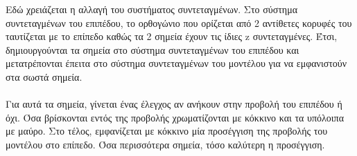 \documentclass{report}
\begin{document}

Εδώ χρειάζεται η αλλαγή του συστήματος συντεταγμένων. Στο σύστημα συντεταγμένων του επιπέδου, το ορθογώνιο που ορίζεται από 2 αντίθετες
κορυφές του ταυτίζεται με το επίπεδο καθώς τα 2 σημεία έχουν τις ίδιες z συντεταγμένες. Έτσι, δημιουργούνται τα σημεία στο σύστημα συντεταγμένων
του επιπέδου και μετατρέπονται έπειτα στο σύστημα συντεταγμένων του μοντέλου για να εμφανιστούν στα σωστά σημεία.
\\\\
Για αυτά τα σημεία, γίνεται ένας έλεγχος αν ανήκουν στην προβολή του επιπέδου ή όχι. Όσα βρίσκονται εντός της προβολής χρωματίζονται με
κόκκινο και τα υπόλοιπα με μαύρο. Στο τέλος, εμφανίζεται με κόκκινο μία προσέγγιση της προβολής του μοντέλου στο επίπεδο. Όσα περισσότερα
σημεία, τόσο καλύτερη η προσέγγιση.

\end{document}
